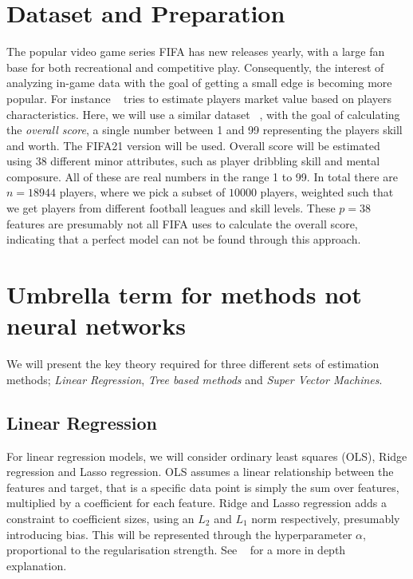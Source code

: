     \section{Dataset and Preparation}
        The popular video game series FIFA has new releases yearly, with a large fan base for both recreational and competitive play. Consequently, the interest of analyzing in-game data with the goal of getting a small edge is becoming more popular. For instance ~\citep{fifa21playersvalue} tries to estimate players market value based on players characteristics. Here, we will use a similar dataset ~\citep{fifa21_data}, with the goal of calculating the \textit{overall score}, a single number between 1 and 99 representing the players skill and worth. The FIFA21 version will be used. Overall score will be estimated using 38 different minor attributes, such as player dribbling skill and mental composure. All of these are real numbers in the range 1 to 99. In total there are $n = 18944$ players, where we pick a subset of $10000$ players, weighted such that we get players from different football leagues and skill levels. These $p = 38$ features are presumably not all FIFA uses to calculate the overall score, indicating that a perfect model can not be found through this approach. 
        
    \section{Umbrella term for methods not neural networks}
        We will present the key theory required for three different sets of estimation methods; \textit{Linear Regression}, \textit{Tree based methods} and \textit{Super Vector Machines}.
        \subsection{Linear Regression}
        For linear regression models, we will consider ordinary least squares (OLS), Ridge regression and Lasso regression. OLS assumes a linear relationship between the features and target, that is a specific data point is simply the sum over features, multiplied by a coefficient for each feature. Ridge and Lasso regression adds a constraint to coefficient sizes, using an $L_2$ and $L_1$ norm respectively, presumably introducing bias. This will be represented through the hyperparameter $\alpha$, proportional to the regularisation strength. See ~\citep{Project1} for a more in depth explanation.
            
